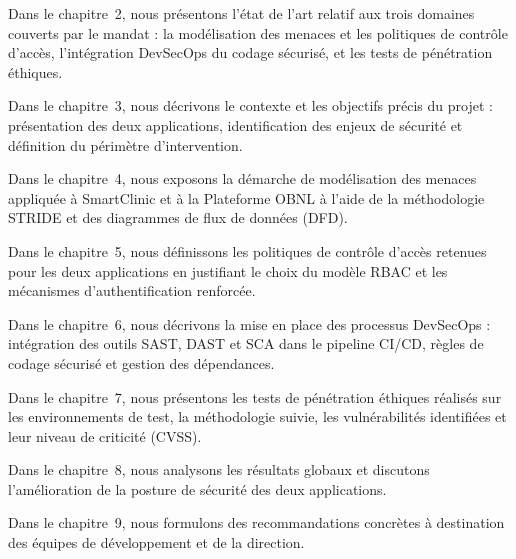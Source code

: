 Dans le chapitre~2, nous présentons l'état de l'art relatif aux trois domaines couverts
par le mandat : la modélisation des menaces et les politiques de contrôle d'accès,
l'intégration DevSecOps du codage sécurisé, et les tests de pénétration éthiques.

Dans le chapitre~3, nous décrivons le contexte et les objectifs précis du projet :
présentation des deux applications, identification des enjeux de sécurité et définition
du périmètre d'intervention.

Dans le chapitre~4, nous exposons la démarche de modélisation des menaces appliquée à
SmartClinic et à la Plateforme OBNL à l'aide de la méthodologie STRIDE et des diagrammes
de flux de données (DFD).

Dans le chapitre~5, nous définissons les politiques de contrôle d'accès retenues pour les
deux applications en justifiant le choix du modèle RBAC et les mécanismes d'authentification
renforcée.

Dans le chapitre~6, nous décrivons la mise en place des processus DevSecOps : intégration
des outils SAST, DAST et SCA dans le pipeline CI/CD, règles de codage sécurisé et gestion
des dépendances.

Dans le chapitre~7, nous présentons les tests de pénétration éthiques réalisés sur les
environnements de test, la méthodologie suivie, les vulnérabilités identifiées et leur
niveau de criticité (CVSS).

Dans le chapitre~8, nous analysons les résultats globaux et discutons l'amélioration de la
posture de sécurité des deux applications.

Dans le chapitre~9, nous formulons des recommandations concrètes à destination des équipes
de développement et de la direction.
